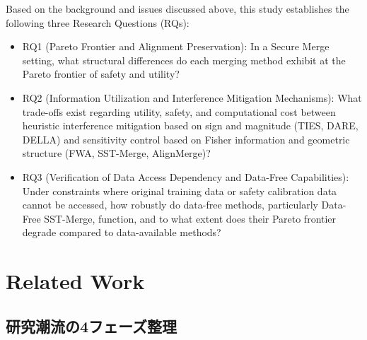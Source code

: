 \documentclass{article}
\begin{document}
Based on the background and issues discussed above, this study establishes the following three Research Questions (RQs):

\begin{itemize}
\item RQ1 (Pareto Frontier and Alignment Preservation): In a Secure Merge setting, what structural differences do each merging method exhibit at the Pareto frontier of safety and utility?
\item RQ2 (Information Utilization and Interference Mitigation Mechanisms): What trade-offs exist regarding utility, safety, and computational cost between heuristic interference mitigation based on sign and magnitude (TIES, DARE, DELLA) and sensitivity control based on Fisher information and geometric structure (FWA, SST-Merge, AlignMerge)?
\item RQ3 (Verification of Data Access Dependency and Data-Free Capabilities): Under constraints where original training data or safety calibration data cannot be accessed, how robustly do data-free methods, particularly Data-Free SST-Merge, function, and to what extent does their Pareto frontier degrade compared to data-available methods?
\end{itemize}

\section{Related Work}

\subsection{研究潮流の4フェーズ整理}

\end{document}
